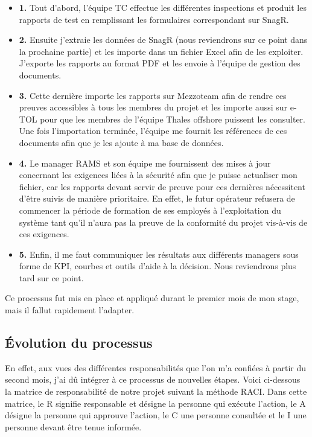 \begin{itemize}
\item \textbf{1.} Tout d'abord, l'équipe \gls{TC} effectue les différentes inspections et produit les rapports de test en remplissant les formulaires correspondant sur \gls{SnagR}.
\item \textbf{2.} Ensuite j'extraie les données de \gls{SnagR} (nous reviendrons sur ce point dans la prochaine partie) et les importe dans un fichier Excel afin de les exploiter. J'exporte les rapports au format PDF et les envoie à l'équipe de gestion des documents.
\item \textbf{3.} Cette dernière importe les rapports sur \gls{Mezzoteam} afin de rendre ces preuves accessibles à tous les membres du projet et les importe aussi sur \gls{e-TOL} pour que les membres de l'équipe Thales offshore puissent les consulter. Une fois l'importation terminée, l'équipe me fournit les références de ces documents afin que je les ajoute à ma base de données.
\item \textbf{4.} Le manager \gls{RAMS} et son équipe me fournissent des mises à jour concernant les exigences liées à la sécurité afin que je puisse actualiser mon fichier, car les rapports devant servir de preuve pour ces dernières nécessitent d'être suivis de manière prioritaire. En effet, le futur opérateur refusera de commencer la période de formation de ses employés à l'exploitation du système tant qu'il n'aura pas la preuve de la conformité du projet vis-à-vis de ces exigences.
\item \textbf{5.} Enfin, il me faut communiquer les résultats aux différents managers sous forme de \gls{KPI}, courbes et outils d'aide à la décision. Nous reviendrons plus tard sur ce point.
\end{itemize}

Ce processus fut mis en place et appliqué durant le premier mois de mon stage, mais il fallut rapidement l'adapter.

\subsection{Évolution du processus}

En effet, aux vues des différentes responsabilités que l'on m'a confiées à partir du second mois, j'ai dû intégrer à ce processus de nouvelles étapes.
Voici ci-dessous la matrice de responsabilité de notre projet suivant la méthode RACI. Dans cette matrice, le R signifie responsable et désigne la personne qui exécute l'action, le A désigne la personne qui approuve l'action, le C une personne consultée et le I une personne devant être tenue informée.

